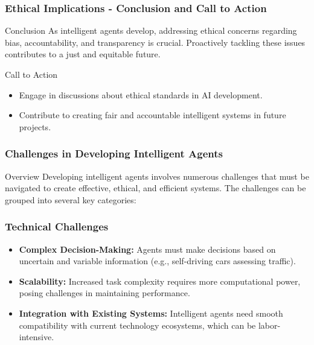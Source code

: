 \documentclass[aspectratio=169]{beamer}
\begin{document}
\begin{frame}[fragile]
    \frametitle{Ethical Implications - Conclusion and Call to Action}
    \begin{block}{Conclusion}
        As intelligent agents develop, addressing ethical concerns regarding bias, accountability, and transparency is crucial. Proactively tackling these issues contributes to a just and equitable future.
    \end{block}

    \begin{block}{Call to Action}
        \begin{itemize}
            \item Engage in discussions about ethical standards in AI development.
            \item Contribute to creating fair and accountable intelligent systems in future projects.
        \end{itemize}
    \end{block}
\end{frame}

\begin{frame}[fragile]
    \frametitle{Challenges in Developing Intelligent Agents}
    \begin{block}{Overview}
        Developing intelligent agents involves numerous challenges that must be navigated to create effective, ethical, and efficient systems. The challenges can be grouped into several key categories:
    \end{block}
\end{frame}

\begin{frame}[fragile]
    \frametitle{Technical Challenges}
    \begin{itemize}
        \item \textbf{Complex Decision-Making:} Agents must make decisions based on uncertain and variable information (e.g., self-driving cars assessing traffic).
        
        \item \textbf{Scalability:} Increased task complexity requires more computational power, posing challenges in maintaining performance.
        
        \item \textbf{Integration with Existing Systems:} Intelligent agents need smooth compatibility with current technology ecosystems, which can be labor-intensive.
    \end{itemize}
\end{frame}
\end{document}
